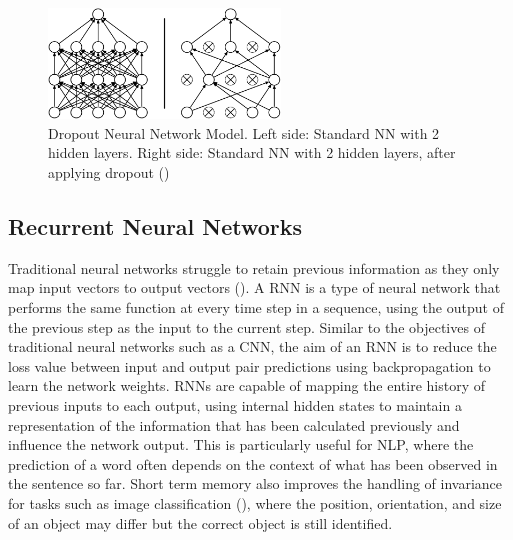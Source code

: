 \begin{figure}[ht!]
\centering
\includegraphics[width=0.55\textwidth]{media/literature/machine_learning/ml_dropout3.png}
\caption[Diagram of the Dropout Neural Network Model]{Dropout Neural Network Model. Left side: Standard \acrshort{NN} with 2 hidden layers. Right side: Standard \acrshort{NN} with 2 hidden layers, after applying dropout (\cite{srivastava_dropout_2014})}
\label{fig:cnn_dropout}
\end{figure}




%    






\subsection{Recurrent Neural Networks}

Traditional neural networks struggle to retain previous information as they only map input vectors to output vectors (\cite{graves_supervised_2012}). A \acrfull{RNN} is a type of neural network that performs the same function at every time step in a sequence, using the output of the previous step as the input to the current step.
Similar to the objectives of traditional neural networks such as a \acrshort{CNN}, the aim of an \acrshort{RNN} is to reduce the loss value between input and output pair predictions using backpropagation to learn the network weights. 
\acrshort{RNN}s are capable of mapping the entire history of previous inputs to each output, using internal hidden states to maintain a representation of the information that has been calculated previously and influence the network output.
This is particularly useful for \acrshort{NLP}, where the prediction of a word often depends on the context of what has been observed in the sentence so far. Short term memory also improves the handling of invariance for tasks such as image classification (\cite{mikolov_recurrent_slides_2010}), where the position, orientation, and size of an object may differ but the correct object is still identified. 

